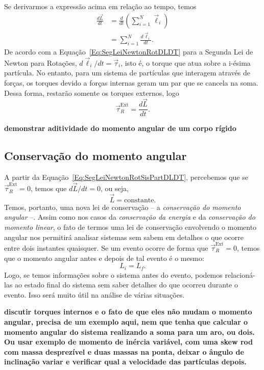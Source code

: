 Se derivarmos a expressão acima em relação ao tempo, temos
\begin{align}
  \frac{d\vec{L}}{dt} &= \frac{d}{dt}\left(\sum_{i=1}^N\vec{\ell}_i\right) \\
  &= \sum_{i=1}^N \frac{d\vec{\ell}_i}{dt}.
\end{align}
%
De acordo com a Equação~\ref{Eq:SegLeiNewtonRotDLDT} para a Segunda Lei de Newton para Rotações, $d\vec{\ell}_i/dt = \vec{\tau}_i$, isto é, o torque que atua sobre a i-ésima partícula. No entanto, para um sistema de partículas que interagem através de forças, os torques devido a forças internas geram um par que se cancela na soma. Dessa forma, restarão somente os torques externos, logo
\begin{equation}\label{Eq:SegLeiNewtonRotSisPartDLDT}
  \vec{\tau}_R^{\textrm{Ext}} = \frac{d\vec{L}}{dt}.
\end{equation}

\textbf{demonstrar aditividade do momento angular de um corpo rígido}

\subsection{Conservação do momento angular}

A partir da Equação~\ref{Eq:SegLeiNewtonRotSisPartDLDT}, percebemos que se $\vec{\tau}_R^{\textrm{Ext}} = 0$, temos que $d\vec{L}/dt = 0$, ou seja,
\begin{equation}
  \vec{L} = \textrm{constante}.
\end{equation}
%
Temos, portanto, uma nova lei de conservação -- a \emph{conservação do momento angular} --. Assim como nos casos da \emph{conservação da energia} e da \emph{conservação do momento linear}, o fato de termos uma lei de conservação envolvendo o momento angular nos permitirá analisar sistemas sem sabem em detalhes o que ocorre entre dois instantes quaisquer. Se um evento ocorre de forma que $\vec{\tau}_R^{\textrm{Ext}} = 0$, temos que o momento angular antes e depois de tal evento é o mesmo:
\begin{equation}
  L_i = L_f.
\end{equation}
%
Logo, se temos informações sobre o sistema antes do evento, podemos relacioná-las ao estado final do sistema sem saber detalhes do que ocorreu durante o evento. Isso será muito útil na análise de várias situações.

\textbf{discutir torques internos e o fato de que eles não mudam o momento angular, precisa de um exemplo aqui, nem que tenha que calcular o momento angular do sistema realizando a soma para um aro, ou dois. Ou usar exemplo de momento de inércia variável, com uma skew rod com massa desprezível e duas massas na ponta, deixar o ângulo de inclinação variar e verificar qual a velocidade das partículas depois.}


